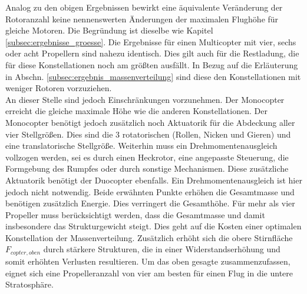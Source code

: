 Analog zu den obigen Ergebnissen bewirkt eine äquivalente Veränderung der Rotoranzahl keine nennenswerten Änderungen der maximalen Flughöhe für gleiche Motoren. Die Begründung ist dieselbe wie Kapitel \ref{subsec:ergebnisse_groesse}. Die Ergebnisse für einen Multicopter mit vier, sechs oder acht Propellern sind nahezu identisch. Dies gilt auch für die Restladung, die für diese Konstellationen noch am größten ausfällt. In Bezug auf die Erläuterung in Abschn. \ref{subsec:ergebnis_massenverteilung} sind diese den Konstellationen mit weniger Rotoren vorzuziehen. \\
An dieser Stelle sind jedoch Einschränkungen vorzunehmen. 
Der Monocopter erreicht die gleiche maximale Höhe wie die anderen Konstellationen. Der Monocopter benötigt jedoch zusätzlich noch Aktuatorik für die Abdeckung aller vier Stellgrößen. Dies sind die 3 rotatorischen (Rollen, Nicken und Gieren) und eine translatorische Stellgröße. Weiterhin muss ein Drehmomentenausgleich vollzogen werden, sei es durch einen Heckrotor, eine angepasste Steuerung, die Formgebung des Rumpfes oder durch sonstige Mechanismen. Diese zusätzliche Aktuatorik benötigt der Duocopter ebenfalls. Ein Drehmomentenausgleich ist hier jedoch nicht notwendig.
Beide erwähnten Punkte erhöhen die Gesamtmasse und benötigen zusätzlich Energie. Dies verringert die Gesamthöhe. 
Für mehr als vier Propeller muss berücksichtigt werden, dass die Gesamtmasse und damit insbesondere das Strukturgewicht steigt. Dies geht auf die Kosten einer optimalen Konstellation der Massenverteilung. Zusätzlich erhöht sich die obere Stirnfläche \ensuremath{F_{copter,oben}} durch stärkere Strukturen, die in einer Widerstandserhöhung und somit erhöhten Verlusten resultieren. Um das oben gesagte zusammenzufassen, eignet sich eine Propelleranzahl von vier am besten für einen Flug in die untere Stratosphäre. 



